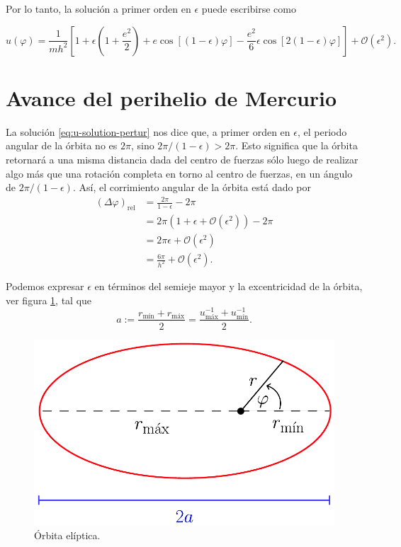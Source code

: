\documentclass[letterpaper,11pt]{article}
\begin{document}
Por lo tanto, la solución a primer orden en $\epsilon$ puede escribirse como
\begin{shaded}
\begin{equation} \label{eq:u-solution-pertur}
u(\varphi) = \frac{1}{mh^2} \left[ 1 + \epsilon \left(1 + \frac{e^2}{2} \right) + e\cos[(1-\epsilon)\varphi] - \frac{e^2}{6} \epsilon \cos[2(1 - \epsilon)\varphi] \right] + \mathcal{O}(\epsilon^2).
\end{equation}
\end{shaded}

\section*{Avance del perihelio de Mercurio}

La solución \eqref{eq:u-solution-pertur} nos dice que, a primer orden en $\epsilon$, el periodo angular de la órbita no es $2\pi$, sino $2\pi/(1-\epsilon) > 2\pi$. Esto significa que la órbita retornará a una misma distancia dada del centro de fuerzas sólo luego de realizar algo más que una rotación completa en torno al centro de fuerzas, en un ángulo de $2\pi/(1-\epsilon)$. Así, el corrimiento angular de la órbita está dado por
\begin{align}
(\Delta \varphi)_{\text{rel}} &= \frac{2\pi}{1-\epsilon} - 2\pi \nonumber\\
&= 2\pi \left( 1 + \epsilon + \mathcal{O}(\epsilon^2) \right) - 2\pi \nonumber\\
&= 2\pi \epsilon + \mathcal{O}(\epsilon^2)\nonumber \\
&= \frac{6\pi}{h^2} + \mathcal{O}(\epsilon^2).
\end{align}


Podemos expresar $\epsilon$ en términos del semieje mayor y la excentricidad de la órbita, ver figura \ref{fig:elipse}, tal que
\begin{equation} \label{eq:semieje-mayor}
a := \frac{r_{\text{mín}} + r_{\text{máx}}}{2} = \frac{u_{\text{máx}}^{-1} + u_{\text{mín}}^{-1}}{2}.
\end{equation}

\begin{figure}
\centering
\includegraphics[scale=0.5]{Elipse}
\caption{Órbita elíptica.}
\label{fig:elipse}
\end{figure}
\end{document}

